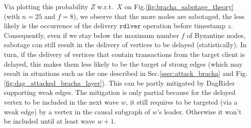 Via plotting this probability $Z$ w.r.t.~$X$ on Fig.\ref{fig:bracha_sabotage_theory} (with $n=25$ and $f=8$), we observe that the more nodes are sabotaged, the less likely is the occurrence of the delivery $\mathtt{rdlver}$ operation before timestamp $z$.
Consequently, even if we stay below the maximum number $f$ of Byzantine nodes, sabotage can still result in the delivery of vertices to be delayed (statistically).
In turn, if the delivery of vertices that contain transactions from the target client is delayed, this makes them less likely to be the target of strong edges (which may result in situations such as the one described in Sec.\ref{ssec:attack_bracha} and Fig.\ref{fig:dag_attacked_bracha_layer}).
This can be partly mitigated by DagRider supporting weak edges.
The mitigation is only partial because for the delayed vertex to be included in the next wave $w$, it still requires to be targeted (via a weak edge) by a vertex in the causal subgraph of $w$'s leader. Otherwise it won't be included until at least wave $w+1$.

